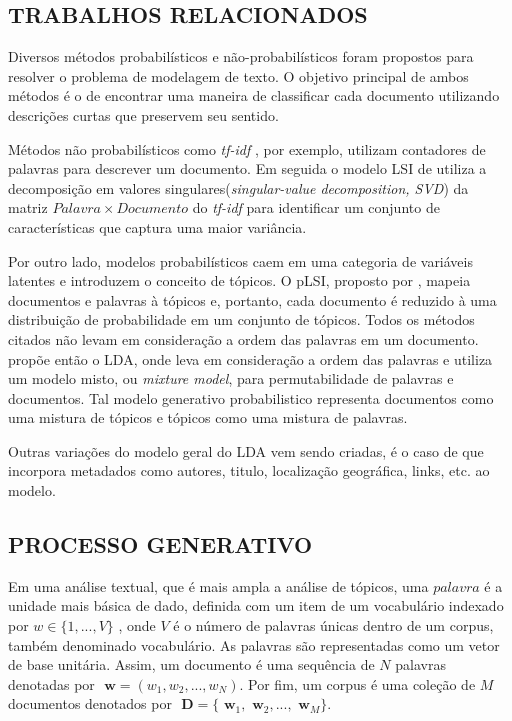 \documentclass[12pt,a4paper]{article}
\begin{document}

\subsection{TRABALHOS RELACIONADOS}

Diversos métodos probabilísticos e não-probabilísticos foram propostos para resolver o problema de modelagem de texto. O objetivo
 principal de ambos métodos é o de encontrar uma maneira de classificar cada documento utilizando descrições curtas que preservem
 seu sentido.

Métodos não probabilísticos como \textit{tf-idf} \cite{salton1983introduction}, por exemplo, utilizam contadores de palavras para descrever um documento.
 Em seguida o modelo LSI de  utiliza a decomposição em valores singulares(\textit{singular-value decomposition, SVD}) da
 matriz $Palavra \times Documento$ do \textit{tf-idf} para identificar um conjunto de características que captura uma maior variância.

Por outro lado, modelos probabilísticos caem em uma categoria de variáveis latentes e introduzem o conceito de tópicos. O pLSI, proposto por , 
 mapeia documentos e palavras à tópicos e, portanto, cada documento é reduzido à uma distribuição de probabilidade em um conjunto de tópicos.
 Todos os métodos citados não levam em consideração a ordem das palavras em um documento.  propõe então o
 LDA, onde leva em consideração a ordem das palavras e utiliza um modelo misto, ou \textit{mixture model}, para permutabilidade de palavras e documentos. Tal
 modelo generativo probabilistico representa documentos como uma mistura de tópicos e tópicos como uma mistura de palavras.

Outras variações do modelo geral do LDA vem sendo criadas, é o caso de 
 que incorpora metadados como autores, titulo, localização geográfica, links, etc. ao modelo.
\subsection{PROCESSO GENERATIVO}

Em uma análise textual, que é mais ampla a análise de  tópicos, uma $palavra$ é a unidade mais básica de dado, definida com um item de um vocabulário indexado por \(w \in \{1,. . . , V\}\)  , onde $V$ é o número de palavras únicas dentro de um corpus, também denominado vocabulário. As palavras são representadas como um vetor de base unitária. Assim, um documento é uma sequência de $N$ palavras denotadas por \(\textbf{ w} = (w_1, w_2,. . . ,  w_N)\). Por fim, um corpus é uma coleção de $M$ documentos denotados por \(\textbf{ D} = \{\textbf{ w}_1, \textbf{ w}_2, . . ., \textbf{ w}_M\}\).
\end{document}
